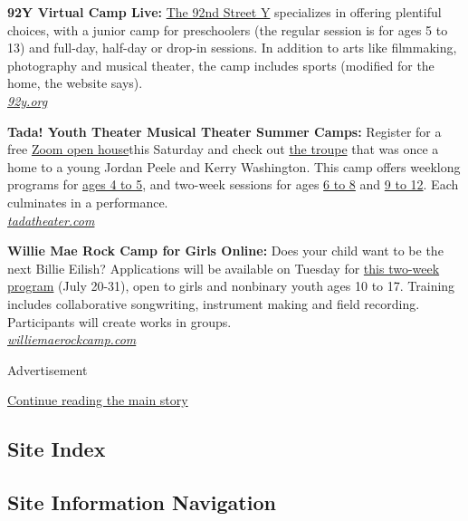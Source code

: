 \textbf{92Y Virtual Camp Live:}
\href{https://www.92y.org/virtual-camp-live}{The 92nd Street Y}
specializes in offering plentiful choices, with a junior camp for
preschoolers (the regular session is for ages 5 to 13) and full-day,
half-day or drop-in sessions. In addition to arts like filmmaking,
photography and musical theater, the camp includes sports (modified for
the home, the website says).\\
\href{https://www.92y.org/}{\emph{92y.org}}

\textbf{Tada! Youth Theater Musical Theater Summer Camps:} Register for
a free
\href{https://tadatheater.secure.force.com/Events/CnP_PaaS_EVT__ExternalRegistrationPage?event_id=a1g1J000007xd3YQAQ}{Zoom
open house}this Saturday and check out
\href{https://www.tadatheater.com/2020-summer-camps}{the troupe} that
was once a home to a young Jordan Peele and Kerry Washington. This camp
offers weeklong programs for
\href{https://www.tadatheater.com/2020-summer-camps-ages-4-5}{ages 4 to
5}, and two-week sessions for ages
\href{https://www.tadatheater.com/2020-summer-camps-ages-6-8}{6 to 8}
and \href{https://www.tadatheater.com/2020-summer-camps-ages-9-12}{9 to
12}. Each culminates in a performance.\\
\href{https://www.tadatheater.com/}{\emph{tadatheater.com}}

\textbf{Willie Mae Rock Camp for Girls Online:} Does your child want to
be the next Billie Eilish? Applications will be available on Tuesday for
\href{https://www.williemaerockcamp.org/}{this two-week program} (July
20-31), open to girls and nonbinary youth ages 10 to 17. Training
includes collaborative songwriting, instrument making and field
recording. Participants will create works in groups.\\
\href{https://www.williemaerockcamp.org/home}{\emph{williemaerockcamp.com}}

Advertisement

\protect\hyperlink{after-bottom}{Continue reading the main story}

\hypertarget{site-index}{%
\subsection{Site Index}\label{site-index}}

\hypertarget{site-information-navigation}{%
\subsection{Site Information
Navigation}\label{site-information-navigation}}

